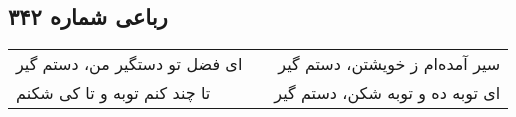 \begin{center}
\section*{رباعی شماره ۳۴۲}
\label{sec:sh342}
\begin{longtable}{l p{0.5cm} r}
ای فضل تو دستگیر من، دستم گیر
&&
سیر آمده‌ام ز خویشتن، دستم گیر
\\
تا چند کنم توبه و تا کی شکنم
&&
ای توبه ده و توبه شکن، دستم گیر
\\
\end{longtable}
\end{center}
